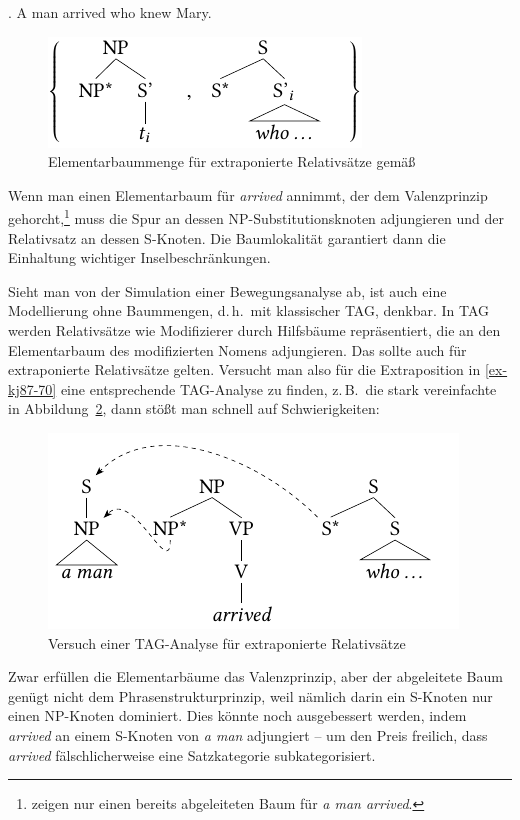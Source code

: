 \ex. \label{ex-kj87-70} A man arrived who knew Mary. \hfill \citep[(70)]{Kroch:Joshi:87}

\begin{figure}[t]
\centering
\includegraphics{graphics/abb517.pdf}
\caption{\label{fig-kj87-1}Elementarbaummenge für extraponierte Relativsätze gemä\ss\ \cite{Kroch:Joshi:87}}
\end{figure}
Wenn man einen Elementarbaum für {\it arrived} annimmt, der dem Valenzprinzip gehorcht,\footnote{\citet[(71)]{Kroch:Joshi:87} zeigen nur einen bereits abgeleiteten Baum für {\it a man arrived}.} muss die Spur an dessen NP-Substitutionsknoten adjungieren und der Relativsatz an dessen S-Knoten. Die Baumlokalität garantiert dann die Einhaltung wichtiger Inselbeschränkungen.  

Sieht man von der Simulation einer Bewegungsanalyse ab, ist auch eine Modellierung ohne Baummengen, d.\,h.\ mit klassischer TAG, denkbar. In TAG werden Relativsätze wie Modifizierer durch Hilfsbäume repräsentiert, die an den Elementarbaum des modifizierten Nomens adjungieren. Das sollte auch für extraponierte Relativsätze gelten. Versucht man also für die Extraposition in \ref{ex-kj87-70} eine entsprechende TAG-Analyse zu finden, z.\,B.\ die stark vereinfachte in Abbildung~\ref{fig-extraposition-1}, dann stö\ss t man schnell auf Schwierigkeiten:  
\begin{figure}[t]
\centering
\includegraphics{graphics/abb518.pdf}
\caption{\label{fig-extraposition-1}Versuch einer TAG-Analyse für extraponierte Relativsätze}
\end{figure}
Zwar erfüllen die Elementarbäume das Valenzprinzip, aber der abgeleitete Baum genügt nicht dem Phrasenstrukturprinzip, weil nämlich darin ein S-Knoten nur einen NP-Knoten dominiert. Dies könnte noch ausgebessert werden, indem {\it arrived} an einem S-Knoten von {\it a man} adjungiert -- um den Preis freilich, dass {\it arrived} fälschlicherweise eine Satzkategorie subkategorisiert. 

